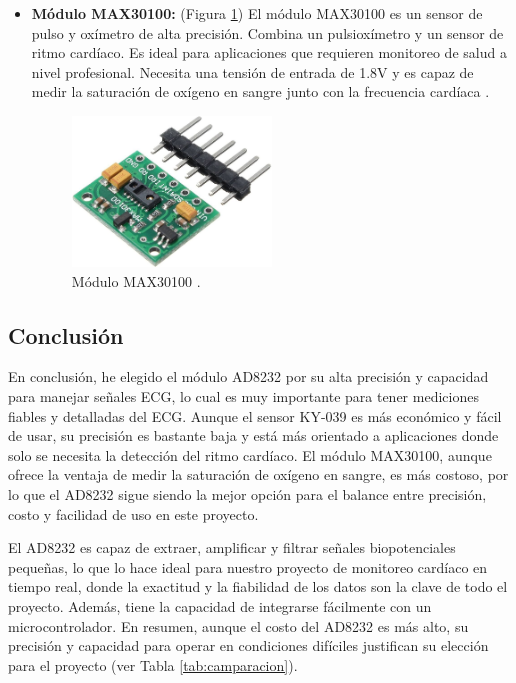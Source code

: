\begin{itemize}
\item \textbf{Módulo MAX30100:} (Figura \ref{fig:max30100})
El módulo MAX30100 es un sensor de pulso y oxímetro de alta precisión. Combina un pulsioxímetro y un sensor de ritmo cardíaco. Es ideal para aplicaciones que requieren monitoreo de salud a nivel profesional. Necesita una tensión de entrada de 1.8V y es capaz de medir la saturación de oxígeno en sangre junto con la frecuencia cardíaca \cite{MAX30100_teoria}.

\begin{figure}[h]
\centering
\includegraphics[width=0.5\textwidth]{img/max30100.jpg}
\caption{Módulo MAX30100 \cite{MAX30100}.}
\label{fig:max30100}
\end{figure}

\end{itemize}

\subsection{Conclusión}

En conclusión, he elegido el módulo AD8232 por su alta precisión y capacidad para manejar señales ECG, lo cual es muy importante para tener mediciones fiables y detalladas del ECG. Aunque el sensor KY-039 es más económico y fácil de usar, su precisión es bastante baja y está más orientado a aplicaciones donde solo se necesita la detección del ritmo cardíaco. El módulo MAX30100, aunque ofrece la ventaja de medir la saturación de oxígeno en sangre, es más costoso, por lo que el AD8232 sigue siendo la mejor opción para el balance entre precisión, costo y facilidad de uso en este proyecto.

El AD8232 es capaz de extraer, amplificar y filtrar señales biopotenciales pequeñas, lo que lo hace ideal para nuestro proyecto de monitoreo cardíaco en tiempo real, donde la exactitud y la fiabilidad de los datos son la clave de todo el proyecto. Además, tiene la capacidad de integrarse fácilmente con un microcontrolador. En resumen, aunque el costo del AD8232 es más alto, su precisión y capacidad para operar en condiciones difíciles justifican su elección para el proyecto (ver Tabla \ref{tab:camparacion}).

